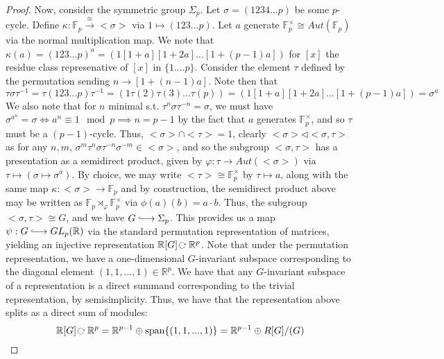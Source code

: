 \documentclass{article}
\newcommand{\bb}[1]{\mathbb{#1}}
\newcommand{\iso}{\cong}
\newcommand{\into}{\lhook\joinrel\longrightarrow}
\newcommand{\actson}{ \hspace{0.02in} \rotatebox[origin=c]{-90}{$\circlearrowright$}\ }
\begin{document}
\begin{proof}
    Now, consider the symmetric group $\Sigma_{p}$. Let $\sigma = (1234...p)$ be some $p$-cycle. Define $\kappa: \bb{F}_{p} \xrightarrow{\iso}<\sigma>$ via $1 \mapsto (123...p)$. Let $a$ generate $\bb{F}_{p}^{\times} \iso Aut(\bb{F}_{p})$ via the normal multiplication map. We note that $\kappa(a) = (123...p)^{a} = (1[1+a][1+2a]...[1+(p-1)a])$ for $[x]$ the residue class represenative of $[x]$ in $\{1....p\}$. Consider the element $\tau$ defined by the permutation sending $n \to[1+(n-1)a]$. Note then that
    \[
      \tau \sigma \tau^{-1} = \tau (123...p) \tau^{-1} = (1\tau(2)\tau(3)...\tau(p)) = (1[1+a][1+2a]...[1+(p-1)a]) = \sigma^{a}
    \]
    We also note that for $n$ minimal s.t. $\tau^{n}\sigma \tau^{-n} = \sigma$, we must have $\sigma^{a^{n}} = \sigma \iff a^{n} \equiv 1 \mod p \implies n = p-1$ by the fact that $a$ generates $\bb{F}_{p}^{\times}$, and so $\tau$ must be a $(p-1)$-cycle. Thus, $<\sigma> \cap <\tau> = 1$, clearly $<\sigma> \triangleleft <\sigma, \tau>$ as for any $n,m$, $\sigma^{m}\tau^{n}\sigma \tau^{-n}\sigma^{-m} \in <\sigma>$, and so the subgroup $<\sigma, \tau>$ has a presentation as a semidirect product, given by $\varphi: \tau \to Aut(<\sigma>)$ via $\tau \mapsto (\sigma \mapsto \sigma^{a})$. By choice, we may write $<\tau> \iso \bb{F}_{p}^{\times}$ by $\tau \mapsto a$, along with the same map $\kappa: <\sigma> \to \bb{F}_{p}$ and by construction, the semidirect product above may be written as $\bb{F}_{p} \rtimes_{\varphi} \bb{F}_{p}^{\times}$ via $\phi(a)(b) = a \cdot b$. Thus, the subgroup $<\sigma, \tau> \iso G$, and we have $G \into \Sigma_{p}$.
    This provides us a map $\psi: G \into GL_{p}(\bb{R})$ via the standard permutation representation of matrices, yielding an injective representation $\bb{R}[G] \actson \bb{R}^{p}$. Note that under the permutation representation, we have a one-dimensional $G$-invariant subspace corresponding to the diagonal element $(1,1,...,1) \in \bb{R}^{p}$. We have that any $G$-invariant subspace of a representation is a direct summand corresponding to the trivial representation, by semisimplicity. Thus, we have that the representation above splits as a direct sum of modules:
    \[
      \bb{R}[G] \actson \bb{R}^{p} = \bb{R}^{p-1} \oplus \text{span}\{(1,1,...,1)\} = \bb{R}^{p-1} \oplus R[G]/(G)
    \]

\end{proof}
\end{document}
